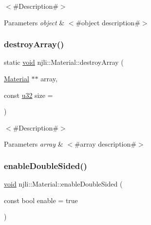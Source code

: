 $<$\#\+Description\#$>$


\begin{DoxyParams}{Parameters}
{\em object} & $<$\#object description\#$>$ \\
\hline
\end{DoxyParams}
\mbox{\label{classnjli_1_1_material_a6095f4248e3366d802bd585f0e75e7c9}} 
\subsubsection{\texorpdfstring{destroy\+Array()}{destroyArray()}}
{\footnotesize\ttfamily static \mbox{\hyperlink{_thread_8h_af1e856da2e658414cb2456cb6f7ebc66}{void}} njli\+::\+Material\+::destroy\+Array (\begin{DoxyParamCaption}\item[{\mbox{\hyperlink{classnjli_1_1_material}{Material}} $\ast$$\ast$}]{array,  }\item[{const \mbox{\hyperlink{_util_8h_a10e94b422ef0c20dcdec20d31a1f5049}{u32}}}]{size = {} }\end{DoxyParamCaption})\hspace{0.3cm}{\ttfamily [static]}}

$<$\#\+Description\#$>$


\begin{DoxyParams}{Parameters}
{\em array} & $<$\#array description\#$>$ \\
\hline
\end{DoxyParams}
\mbox{\label{classnjli_1_1_material_a637971ef59e44b54f49522882f6b1c67}} 
\subsubsection{\texorpdfstring{enable\+Double\+Sided()}{enableDoubleSided()}}
{\footnotesize\ttfamily \mbox{\hyperlink{_thread_8h_af1e856da2e658414cb2456cb6f7ebc66}{void}} njli\+::\+Material\+::enable\+Double\+Sided (\begin{DoxyParamCaption}\item[{const bool}]{enable = {\ttfamily true} }\end{DoxyParamCaption})}


